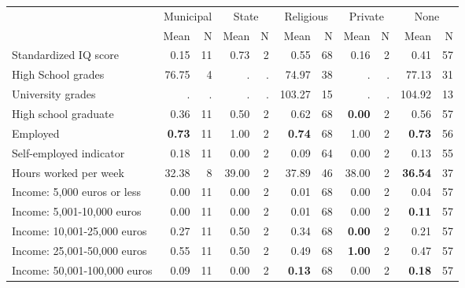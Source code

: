 \begin{tabular}{l r r r r r r r r r r}
\toprule
& \multicolumn{2}{c}{Municipal} & \multicolumn{2}{c}{State} & \multicolumn{2}{c}{Religious} & \multicolumn{2}{c}{Private} & \multicolumn{2}{c}{None} \\
& \scriptsize Mean & \scriptsize N & \scriptsize Mean & \scriptsize N & \scriptsize Mean & \scriptsize N & \scriptsize Mean & \scriptsize N & \scriptsize Mean & \scriptsize N \\
\midrule
Standardized IQ score &      0.15 &        11 &      0.73 &         2 &      0.55 &        68 &      0.16 &         2 &      0.41 &        57 \\
High School grades &     76.75 &         4 &         . & . &     74.97 &        38 &         . & . &     77.13 &        31 \\
University grades &         . & . &         . & . &    103.27 &        15 &         . & . &    104.92 &        13 \\
High school graduate &      0.36 &        11 &      0.50 &         2 &      0.62 &        68 & \textbf{     0.00} &         2 &      0.56 &        57 \\
Employed & \textbf{     0.73} &        11 &      1.00 &         2 & \textbf{     0.74} &        68 &      1.00 &         2 & \textbf{     0.73} &        56 \\
Self-employed indicator &      0.18 &        11 &      0.00 &         2 &      0.09 &        64 &      0.00 &         2 &      0.13 &        55 \\
Hours worked per week &     32.38 &         8 &     39.00 &         2 &     37.89 &        46 &     38.00 &         2 & \textbf{    36.54} &        37 \\
Income: 5,000 euros or less &      0.00 &        11 &      0.00 &         2 &      0.01 &        68 &      0.00 &         2 &      0.04 &        57 \\
Income: 5,001-10,000 euros &      0.00 &        11 &      0.00 &         2 &      0.01 &        68 &      0.00 &         2 & \textbf{     0.11} &        57 \\
Income: 10,001-25,000 euros &      0.27 &        11 &      0.50 &         2 &      0.34 &        68 & \textbf{     0.00} &         2 &      0.21 &        57 \\
Income: 25,001-50,000 euros &      0.55 &        11 &      0.50 &         2 &      0.49 &        68 & \textbf{     1.00} &         2 &      0.47 &        57 \\
Income: 50,001-100,000 euros &      0.09 &        11 &      0.00 &         2 & \textbf{     0.13} &        68 &      0.00 &         2 & \textbf{     0.18} &        57 \\

\end{tabular}
